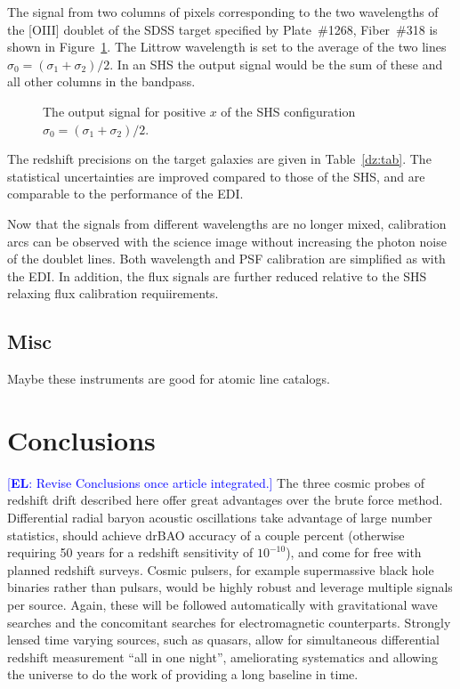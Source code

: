 \documentclass[preprint2, 10pt]{aastex}
\newcommand{\eric}[1]{\textcolor{blue}{[{\bf EL}: #1]}}
\begin{document}
The signal from two columns of pixels corresponding to the two wavelengths of
the [OIII] doublet of the
SDSS target specified by Plate~\#1268, Fiber~\#318 is shown in Figure~\ref{edshs:fig}.
The Littrow wavelength is set to the average of the two lines  $\sigma_0=(\sigma_1+\sigma_2)/2$.
In an SHS the output signal would be the sum of these and all other columns in the bandpass.


\begin{figure}[t]
   \centering
   \caption{The output signal for positive $x$ of the  SHS configuration
    $\sigma_0=(\sigma_1+\sigma_2)/2$. \label{edshs:fig}}
\end{figure}

The redshift precisions on the target galaxies are given in Table~\ref{dz:tab}.  The statistical uncertainties are improved compared to those of the
SHS, and are comparable to the performance of the EDI.

Now that the signals from different wavelengths are no longer mixed, calibration arcs can be observed with the science image without increasing
the photon noise of the doublet lines.  Both wavelength and PSF calibration are simplified as with the EDI.
In addition, the flux signals are further reduced relative to the SHS relaxing flux calibration requiirements.


\subsection{Misc}
Maybe these instruments are good for atomic line catalogs.




\section{Conclusions} \label{sec:concl} 

\eric{Revise Conclusions once article integrated.} 
The three cosmic probes of redshift drift described here offer great 
advantages over the brute force method.  Differential radial baryon acoustic 
oscillations take advantage of large number statistics, should achieve drBAO 
accuracy of a couple percent (otherwise requiring 50 years for a redshift 
sensitivity of $10^{-10}$), and come for free with planned redshift surveys. 
Cosmic pulsers, for example supermassive black hole binaries rather than 
pulsars, would be highly robust and leverage multiple signals per source.  
Again, these will be followed automatically with gravitational wave 
searches and the concomitant searches for electromagnetic counterparts.  
Strongly lensed time varying sources, such as quasars, allow for simultaneous 
differential redshift measurement ``all in one night'', ameliorating 
systematics and allowing the universe to do the work of providing a long 
baseline in time.  
\end{document}

